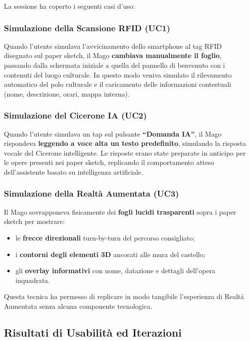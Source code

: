 La sessione ha coperto i seguenti casi d'uso:

\subsubsection{Simulazione della Scansione RFID (UC1)}

Quando l'utente simulava l'avvicinamento dello smartphone al tag RFID disegnato sul paper sketch, il Mago \textbf{cambiava manualmente il foglio}, passando dalla schermata iniziale a quella del pannello di benvenuto con i contenuti del luogo culturale. In questo modo veniva simulato il rilevamento automatico del polo culturale e il caricamento delle informazioni contestuali (nome, descrizione, orari, mappa interna).

\subsubsection{Simulazione del Cicerone IA (UC2)}

Quando l'utente simulava un tap sul pulsante \textbf{``Domanda IA''}, il Mago rispondeva \textbf{leggendo a voce alta un testo predefinito}, simulando la risposta vocale del Cicerone intelligente. Le risposte erano state preparate in anticipo per le opere presenti nei paper sketch, replicando il comportamento atteso dell'assistente basato su intelligenza artificiale.

\subsubsection{Simulazione della Realtà Aumentata (UC3)}

Il Mago sovrapponeva fisicamente dei \textbf{fogli lucidi trasparenti} sopra i paper sketch per mostrare:
\begin{itemize}[nosep, leftmargin=1.6em]
    \item le \textbf{frecce direzionali} turn-by-turn del percorso consigliato;
    \item i \textbf{contorni degli elementi 3D} ancorati alle mura del castello;
    \item gli \textbf{overlay informativi} con nome, datazione e dettagli dell'opera inquadrata.
\end{itemize}
Questa tecnica ha permesso di replicare in modo tangibile l'esperienza di Realtà Aumentata senza alcuna componente tecnologica.

\subsection{Risultati di Usabilità ed Iterazioni}

